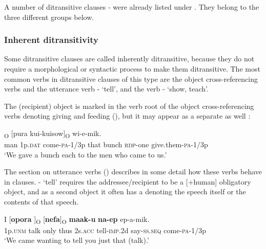 A number of ditransitive clauses - were already listed under . They belong to the three different groups below.

\subsubsection[Inherent ditransitivity ]{Inherent ditransitivity} \label{sec:5.3.2.1} 

Some  ditransitive clauses are called inherently ditransitive, because they do not require a morphological or syntactic process to make them ditransitive. The most common verbs in ditransitive clauses of this type are the object cross-referencing verbs and the utterance verb - `tell', and the verb - `show, teach'.

The (recipient) object is marked in the verb root of the object cross-referencing verbs denoting giving and feeding (), but it may appear as a separate  as well :

\ea%
\label{ex:5:x950}
\textsubscript{O}  [pura  kui-kuisow]\textsubscript{O} wi-e-mik. \\
     man  1p.\textsc{dat}  come-\textsc{pa}-1/3p  that  bunch  \textsc{rdp}-one give.them-\textsc{pa}-1/3p \\
\glt `We gave a bunch each to the men who came to us.'
\z

The section on utterance verbs () describes in some detail how these verbs behave in clauses. - `tell' requires the addressee/recipient to be a [+human] obligatory object, and as a second object it often has a  denoting the speech itself or the contents of that speech. 

\ea%
\label{ex:5:x1839}
\gll I  [\textbf{opora}  ]\textsubscript{O}  [\textbf{nefa}]\textsubscript{O} \textbf{maak-u} \textbf{na-ep} ep-a-mik. \\
     1p.\textsc{unm}  talk  only  thus  2s.\textsc{acc}  tell-\textsc{imp}.2d  say-\textsc{ss}.\textsc{seq} come-\textsc{pa}-1/3p \\
\glt `We came wanting to tell you just that (talk).'
\z

